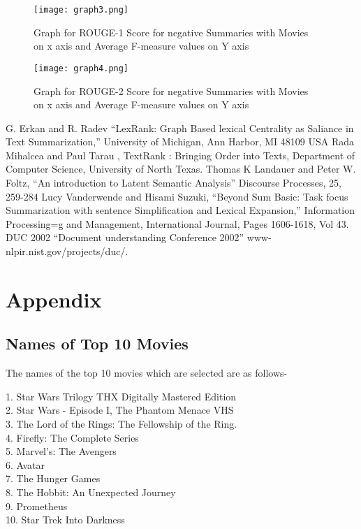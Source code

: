 \documentclass[conference]{IEEEtran}
\begin{document}
\begin{figure}[h!]
  \texttt{[image: graph3.png]}
  \caption{Graph for ROUGE-1 Score for negative Summaries with Movies \\ on x axis and 
   Average F-measure values on Y axis}
  \label{fig:boat1}
\end{figure}

\begin{figure}[h!]
  \texttt{[image: graph4.png]}
  \caption{Graph for ROUGE-2 Score for negative Summaries with Movies \\ on x axis and 
   Average F-measure values on Y axis}
  \label{fig:boat1}
\end{figure}



\begin{thebibliography}{00}
 G. Erkan and R. Radev ``LexRank: Graph Based lexical Centrality as Saliance in Text Summarization,'' University of Michigan, Ann Harbor, MI 48109 USA
 Rada Mihalcea and Paul Tarau , TextRank : Bringing Order into Texts, Department of Computer Science, University of North Texas.
Thomas K Landauer and Peter W. Foltz, ``An introduction to Latent Semantic Analysis'' Discourse Processes, 25, 259-284
 Lucy Vanderwende and Hisami Suzuki, ``Beyond Sum Basic: Task focus Summarization with sentence Simplification and Lexical Expansion,'' Information Processing=g and Management, International Journal, Pages 1606-1618, Vol 43.
 DUC 2002 ``Document understanding Conference 2002'' www-nlpir.nist.gov/projects/duc/.

\end{thebibliography}



\section{Appendix}

\subsection{Names of Top 10 Movies}
The names of the top 10 movies which are selected are as follows-

1. Star Wars Trilogy THX Digitally Mastered Edition\\
2. Star Wars - Episode I, The Phantom Menace VHS \\
3. The Lord of the Rings: The Fellowship of the Ring.\\ 
4. Firefly: The Complete Series \\
5. Marvel's: The Avengers \\
6. Avatar\\
7. The Hunger Games\\
8. The Hobbit: An Unexpected Journey\\
9. Prometheus\\
10. Star Trek Into Darkness\\
\end{document}
